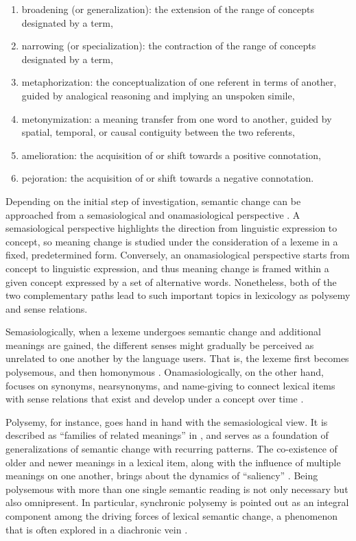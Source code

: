 \begin{enumerate}[label={(\arabic*)},nolistsep]
\item broadening (or generalization): the extension of the range of concepts designated by a term, 
\item narrowing (or specialization): the contraction of the range of concepts designated by a term, 
\item metaphorization: the conceptualization of one referent in terms of another, guided by analogical reasoning and implying an unspoken simile, 
\item metonymization: a meaning transfer from one word to another, guided by spatial, temporal, or causal contiguity between the two referents, 
\item amelioration: the acquisition of or shift towards a positive connotation,
\item pejoration: the acquisition of or shift towards a negative connotation.
\end{enumerate}
\vspace*{\baselineskip}

Depending on the initial step of investigation, semantic change can be approached from a semasiological and onamasiological perspective \parencites[17]{geeraerts1997diachronic}[25]{traugott2001regularity}. A semasiological perspective highlights the direction from linguistic expression to concept, so meaning change is studied under the consideration of a lexeme in a fixed, predetermined form. Conversely, an onamasiological perspective starts from concept to linguistic expression, and thus meaning change is framed within a given concept expressed by a set of alternative words. Nonetheless, both of the two complementary paths lead to such important topics in lexicology as polysemy and sense relations.

Semasiologically, when a lexeme undergoes semantic change and additional meanings are gained, the different senses might gradually be perceived as unrelated to one another by the language users. That is, the lexeme first becomes polysemous, and then homonymous \parencite[25]{traugott2001regularity}. Onamasiologically, on the other hand, focuses on synonyms, near­synonyms, and name-­giving to connect lexical items with sense relations that exist and develop under a concept over time \parencite[17]{geeraerts1997diachronic}.

Polysemy, for instance, goes hand in hand with the semasiological view. It is described as ``families of related meanings'' in \textcite[11]{traugott2001regularity}, and serves as a foundation of generalizations of semantic change with recurring patterns. The co­-existence of older and newer meanings in a lexical item, along with the influence of multiple meanings on one another, brings about the dynamics of ``saliency'' \parencite[12]{traugott2001regularity}. Being polysemous with more than one single semantic reading is not only necessary but also omnipresent. In particular, synchronic polysemy is pointed out as an integral component among the driving forces of lexical semantic change, a phenomenon that is often explored in a diachronic vein \parencite{robertinvanhove2008}.

